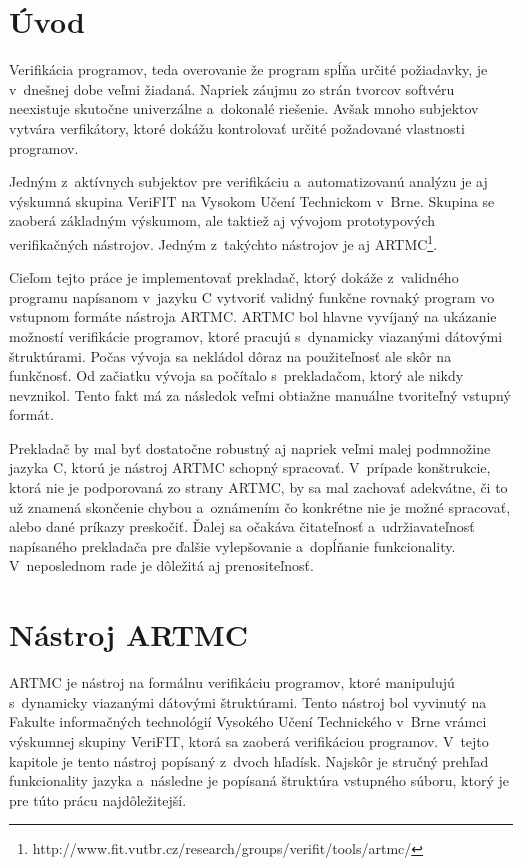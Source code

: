 
\chapter{Úvod}
Verifikácia programov, teda overovanie že program spĺňa určité požiadavky, je v~dnešnej dobe veľmi žiadaná. Napriek záujmu zo strán tvorcov softvéru neexistuje skutočne univerzálne a~dokonalé riešenie. Avšak mnoho subjektov vytvára verfikátory, ktoré dokážu kontrolovať určité požadované vlastnosti programov.

Jedným z~aktívnych subjektov pre verifikáciu a~automatizovanú analýzu je aj výskumná skupina VeriFIT na Vysokom Učení Technickom v~Brne. Skupina se zaoberá základným výskumom, ale taktiež aj vývojom prototypových verifikačných nástrojov. Jedným z~takýchto nástrojov je aj ARTMC\footnote{http://www.fit.vutbr.cz/research/groups/verifit/tools/artmc/}.

Cieľom tejto práce je implementovať prekladač, ktorý dokáže z~validného programu napísanom v~jazyku C vytvoriť validný funkčne rovnaký program vo vstupnom formáte nástroja ARTMC. ARTMC bol hlavne vyvíjaný na ukázanie možností verifikácie programov, ktoré pracujú s~dynamicky viazanými dátovými štruktúrami. Počas vývoja sa nekládol dôraz na použiteľnosť ale skôr na funkčnosť. Od začiatku vývoja sa počítalo s~prekladačom, ktorý ale nikdy nevznikol. Tento fakt má za následok veľmi obtiažne manuálne tvoriteľný vstupný formát. 

Prekladač by mal byť dostatočne robustný aj napriek veľmi malej podmnožine jazyka C, ktorú je nástroj ARTMC schopný spracovať. V~prípade konštrukcie, ktorá nie je podporovaná zo strany ARTMC, by sa mal  zachovať adekvátne, či to už znamená skončenie chybou a~oznámením čo konkrétne nie je možné spracovať, alebo dané príkazy preskočiť. Ďalej sa očakáva čitateľnosť a~udržiavateľnosť napísaného prekladača pre ďalšie vylepšovanie a~dopĺňanie funkcionality. V~neposlednom rade je dôležitá aj prenositeľnosť.


\chapter{Nástroj ARTMC}
\label{kap_artmc}
ARTMC je nástroj na formálnu verifikáciu programov, ktoré manipulujú
s~dynamicky viazanými dátovými štruktúrami. Tento nástroj bol vyvinutý na Fakulte
informačných technológií Vysokého Učení Technického v~Brne vrámci výskumnej skupiny VeriFIT,
ktorá sa zaoberá verifikáciou programov. V~tejto kapitole je tento nástroj
popísaný z~dvoch hľadísk. Najskôr je stručný prehľad funkcionality jazyka
a~následne je popísaná štruktúra vstupného súboru, ktorý je pre túto prácu
najdôležitejší.

